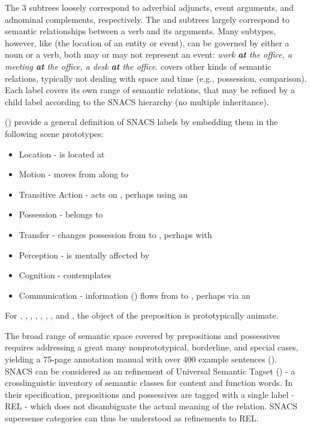 The 3 subtrees loosely correspond to adverbial adjuncts, event arguments, and adnominal complements, respectively. The  and  subtrees largely correspond to semantic relationships between a verb and its arguments. Many  subtypes, however, like   (the location of an entity or event), can be governed by either a noun or a verb, both may or may not represent an event: \emph{work \textbf{at} the office, a meeting \textbf{at} the office, a desk \textbf{at} the office}.  covers other kinds of semantic relations, typically not dealing with space and time (e.g., possession, comparison). Each label covers its own range of semantic relations, that may be refined by a child label according to the SNACS hierarchy (no multiple inheritance). 

(\cite{snacs}) provide a general definition of SNACS labels by embedding them in the following scene prototypes: 

\begin{itemize}
\item Location -  is located at 
\item Motion -  moves from  along  to  
\item Transitive Action -  acts on  , perhaps using an  
\item Possession -  belongs to  
\item Transfer -  changes possession from  to , perhaps with 
\item Perception -  is mentally affected by 
\item Cognition -  contemplates 
\item Communication - information () flows from  to , perhaps via an 
\end{itemize}

For , , , , , , , and , the object of the preposition is prototypically animate.

The broad range of semantic space covered by prepositions and possessives requires addressing a great many nonprototypical, borderline, and special cases, yielding a 75-page annotation manual with over 400 example sentences (\cite{schneider-18-arxiv}). SNACS can be considered as an refinement of Universal Semantic Tagset (\cite{abzianidze-17}) - a crosslinguistic inventory of semantic classes for content and function words. In their specification, prepositions and possessives are tagged with a single label - REL - which does not disambiguate the actual meaning of the relation. SNACS supersense categories can thus be understood as refinements to REL.

